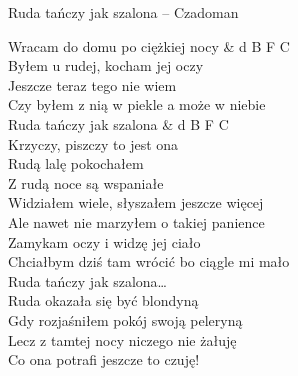\begin{piosenka}{Ruda tańczy jak szalona -- Czadoman}

Wracam do domu po ciężkiej nocy & d B F C \\
Byłem u rudej, kocham jej oczy \\
Jeszcze teraz tego nie wiem \\
Czy byłem z nią w piekle a może w niebie \\[\zwrotkaspace]

 Ruda tańczy jak szalona & d B F C \\
 Krzyczy, piszczy to jest ona \\
 Rudą lalę pokochałem \\
 Z rudą noce są wspaniałe \\[\zwrotkaspace]

Widziałem wiele, słyszałem jeszcze więcej \\
Ale nawet nie marzyłem o takiej panience \\
Zamykam oczy i widzę jej ciało \\
Chciałbym dziś tam wrócić bo ciągle mi mało \\[\zwrotkaspace]

 Ruda tańczy jak szalona\ldots \\[\zwrotkaspace]

Ruda okazała się być blondyną \\
Gdy rozjaśniłem pokój swoją peleryną \\
Lecz z tamtej nocy niczego nie żałuję \\
Co ona potrafi jeszcze to czuję! \\[\zwrotkaspace]

\end{piosenka}